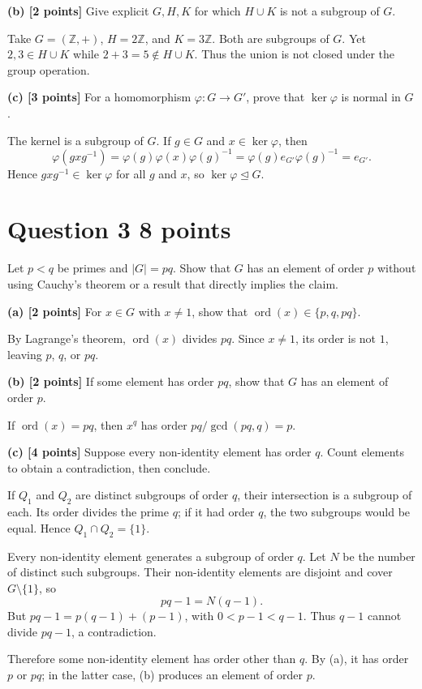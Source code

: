 \documentclass[11pt,letterpaper]{article}
\newcommand{\Z}{\mathbb Z}
\begin{document}
\textbf{(b) [2 points]} Give explicit $G,H,K$ for which $H\cup K$ is not a subgroup of $G$.
\begin{solutionbox}
Take $G=(\Z,+)$, $H=2\Z$, and $K=3\Z$. Both are subgroups of $G$. Yet $2,3\in H\cup K$ while $2+3=5\notin H\cup K$. Thus the union is not closed under the group operation.
\end{solutionbox}

\textbf{(c) [3 points]} For a homomorphism $\varphi:G\to G'$, prove that $\ker\varphi$ is normal in $G$.
\begin{solutionbox}
The kernel is a subgroup of $G$. If $g\in G$ and $x\in\ker\varphi$, then
\[
  \varphi(gxg^{-1})
  =\varphi(g)\varphi(x)\varphi(g)^{-1}
  =\varphi(g)e_{G'}\varphi(g)^{-1}
  =e_{G'}.
\]
Hence $gxg^{-1}\in\ker\varphi$ for all $g$ and $x$, so $\ker\varphi\trianglelefteq G$.
\end{solutionbox}

\section*{Question 3 \hfill 8 points}
Let $p<q$ be primes and $|G|=pq$. Show that $G$ has an element of order $p$ without using Cauchy's theorem or a result that directly implies the claim.

\textbf{(a) [2 points]} For $x\in G$ with $x\neq1$, show that $\operatorname{ord}(x)\in\{p,q,pq\}$.
\begin{solutionbox}
By Lagrange's theorem, $\operatorname{ord}(x)$ divides $pq$. Since $x\neq1$, its order is not $1$, leaving $p$, $q$, or $pq$.
\end{solutionbox}

\textbf{(b) [2 points]} If some element has order $pq$, show that $G$ has an element of order $p$.
\begin{solutionbox}
If $\operatorname{ord}(x)=pq$, then $x^q$ has order
$pq/\gcd(pq,q)=p$.
\end{solutionbox}

\textbf{(c) [4 points]} Suppose every non-identity element has order $q$. Count elements to obtain a contradiction, then conclude.
\begin{solutionbox}
If $Q_1$ and $Q_2$ are distinct subgroups of order $q$, their intersection is a subgroup of each. Its order divides the prime $q$; if it had order $q$, the two subgroups would be equal. Hence $Q_1\cap Q_2=\{1\}$.

Every non-identity element generates a subgroup of order $q$. Let $N$ be the number of distinct such subgroups. Their non-identity elements are disjoint and cover $G\setminus\{1\}$, so
\[
  pq-1=N(q-1).
\]
But $pq-1=p(q-1)+(p-1)$, with $0<p-1<q-1$. Thus $q-1$ cannot divide $pq-1$, a contradiction.

Therefore some non-identity element has order other than $q$. By (a), it has order $p$ or $pq$; in the latter case, (b) produces an element of order $p$.
\end{solutionbox}
\end{document}
